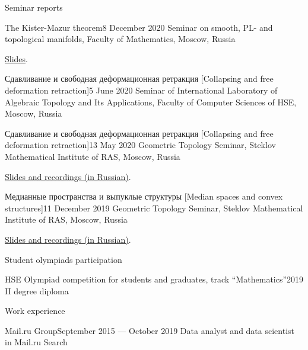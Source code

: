 \documentclass{resume}
\begin{document}
\begin{rSection}{Seminar reports}
  \begin{rSubsection}{The Kister-Mazur theorem}{8 December 2020}{}
    Seminar on smooth, PL- and topological manifolds, Faculty of Mathematics, Moscow, Russia
    \vspace{0.5em}

    \href{https://drive.google.com/file/d/1WE5F7Bgqm7x6pB6irsLrthQtfk3Psl7e/view}{Slides}.
  \end{rSubsection}

  \begin{rSubsection}{Сдавливание и свободная деформационная ретракция [Collapsing and free
      deformation retraction]}{5 June 2020}{}
    Seminar of International Laboratory of Algebraic Topology and Its Applications, Faculty of
    Computer Sciences of HSE, Moscow, Russia
  \end{rSubsection}

  \begin{rSubsection}{Сдавливание и свободная деформационная ретракция [Collapsing and free deformation retraction]}{13 May 2020}{}
    Geometric Topology Seminar, Steklov Mathematical Institute of RAS, Moscow, Russia
    \vspace{0.5em}

    \href{http://www.mathnet.ru/php/seminars.phtml?option_lang=eng&presentid=27125}{Slides and recordings (in Russian)}.
  \end{rSubsection}

  \begin{rSubsection}{Медианные пространства и выпуклые структуры [Median spaces and convex structures]}{11 December 2019}{}
    Geometric Topology Seminar, Steklov Mathematical Institute of RAS, Moscow, Russia
    \vspace{0.5em}

    \href{http://www.mathnet.ru/php/seminars.phtml?option_lang=eng&presentid=26027}{Slides and recordings (in Russian)}.
  \end{rSubsection}
\end{rSection}

\begin{rSection}{Student olympiads participation}
  \begin{rSubsection}{HSE Olympiad competition for students and graduates, track ``Mathematics''}{2019}{}
    II degree diploma
  \end{rSubsection}
\end{rSection}

\begin{rSection}{Work experience}
  \begin{rSubsection}{Mail.ru Group}{September 2015 --- October 2019}{}
    Data analyst and data scientist in Mail.ru Search
  \end{rSubsection}
\end{rSection}
\end{document}

